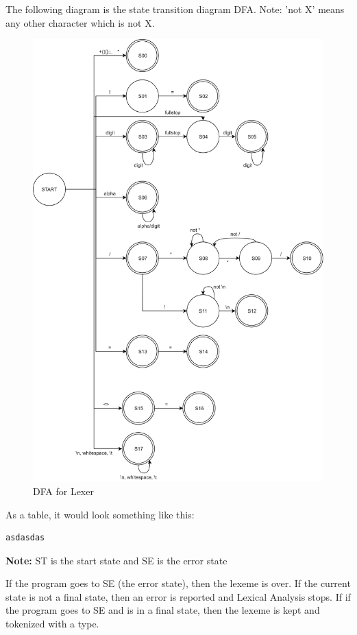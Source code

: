 The following diagram is the state transition diagram DFA. Note: 'not X' means any other character which is not X.
\begin{figure}[H]
	\centering
	\includegraphics[width=\textwidth]{Images/Q1_StateTransitionDiagram.png}
	\caption{DFA for Lexer}
\end{figure}

As a table, it would look something like this:
\begin{lstlisting}[language=C]
asdasdas
\end{lstlisting}

\textbf{Note:} ST is the start state and SE is the error state

If the program goes to SE (the error state), then the lexeme is over. If the current state is not a final state, then an error is reported and Lexical Analysis stops. If if the program goes to SE and is in a final state, then the lexeme is kept and tokenized with a type.

